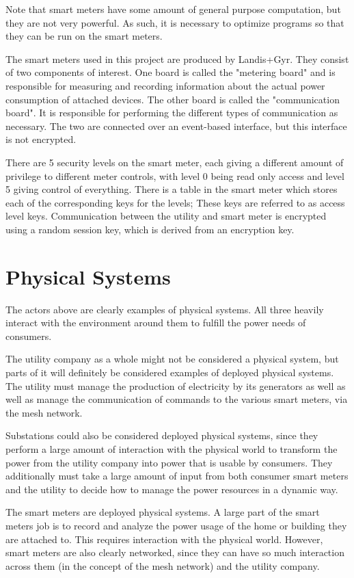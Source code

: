 Note that smart meters have some amount of general purpose computation, but they are not very powerful. As such,
it is necessary to optimize programs so that they can be run on the smart meters.

The smart meters used in this project are produced by Landis+Gyr. They consist of two components of interest. One
board is called the "metering board" and is responsible for measuring and recording information about the actual
power consumption of attached devices. The other board is called the "communication board". It is responsible for
performing the different types of communication as necessary. The two are connected over an event-based interface,
but this interface is not encrypted. 

There are 5 security levels on the smart meter, each giving a different amount of privilege to different meter controls,
with level 0 being read only access and level 5 giving control of everything. There is a table in the smart meter which
stores each of the corresponding keys for the levels; These keys are referred to as access level keys.
Communication between the utility and smart meter is encrypted
using a random session key, which is derived from an encryption key.

\section{Physical Systems}
The actors above are clearly examples of physical systems. All three heavily interact with the environment around them
to fulfill the power needs of consumers.

The utility company as a whole might not be considered a physical system, but parts of it will definitely be considered
examples of deployed physical systems. The utility must manage the production of electricity by its generators as well
as well as manage the communication of commands to the various smart meters, via the mesh network.

Substations could also be considered deployed physical systems, since they perform a large amount of interaction
with the physical world to transform the power from the utility company into power that is usable by consumers.
They additionally must take a large amount of input from both consumer smart meters and the utility to decide how
to manage the power resources in a dynamic way.

The smart meters are deployed physical systems. A large part of the smart meters job is to record and analyze
the power usage of the home or building they are attached to. This requires interaction with the physical world. However,
smart meters are also clearly networked, since they can have so much interaction across them (in the 
concept of the mesh network) and the utility company.


